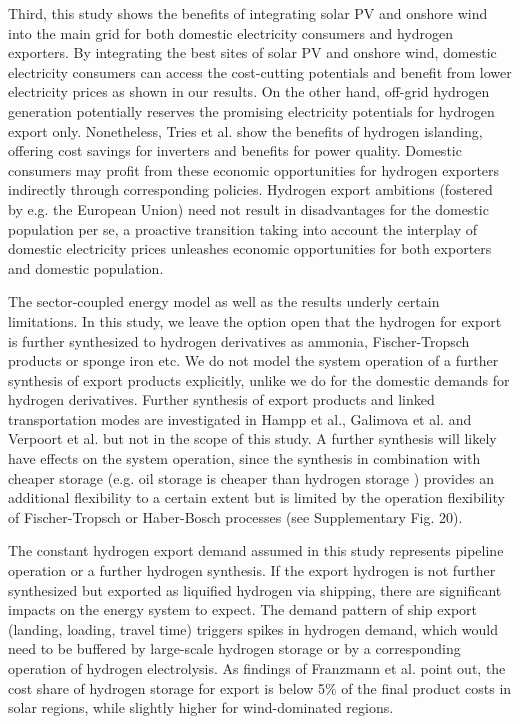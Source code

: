 Third, this study shows the benefits of integrating solar PV and onshore wind into the main grid for both domestic electricity consumers and hydrogen exporters. By integrating the best sites of solar PV and onshore wind, domestic electricity consumers can access the cost-cutting potentials and benefit from lower electricity prices as shown in our results. On the other hand, off-grid hydrogen generation potentially reserves the promising electricity potentials for hydrogen export only. Nonetheless, Tries et al.\cite{Tries2023b} show the benefits of hydrogen islanding, offering cost savings for inverters and benefits for power quality. Domestic consumers may profit from these economic opportunities for hydrogen exporters indirectly through corresponding policies.
Hydrogen export ambitions (fostered by e.g. the European Union) need not result in disadvantages for the domestic population per se, a proactive transition taking into account the interplay of domestic electricity prices unleashes economic opportunities for both exporters and domestic population.



The sector-coupled energy model as well as the results underly certain limitations. In this study, we leave the option open that the hydrogen for export is further synthesized to hydrogen derivatives as ammonia, Fischer-Tropsch products or sponge iron etc. We do not model the system operation of a further synthesis of export products explicitly, unlike we do for the domestic demands for hydrogen derivatives. Further synthesis of export products and linked transportation modes are investigated in Hampp et al.\cite{Hampp2023}, Galimova et al.\cite{Galimova2023} and Verpoort et al.\cite{Verpoort2024} but not in the scope of this study.
A further synthesis will likely have effects on the system operation, since the synthesis in combination with cheaper storage (e.g. oil storage is cheaper than hydrogen storage \cite{DEA2019TechnologyData}) provides an additional flexibility to a certain extent but is limited by the operation flexibility of Fischer-Tropsch or Haber-Bosch processes (see Supplementary Fig. 20). %

The constant hydrogen export demand assumed in this study represents pipeline operation or a further hydrogen synthesis.
If the export hydrogen is not further synthesized but exported as liquified hydrogen via shipping, there are significant impacts on the energy system to expect. The demand pattern of ship export (landing, loading, travel time) triggers spikes in hydrogen demand, which would need to be buffered by large-scale hydrogen storage or by a corresponding operation of hydrogen electrolysis. As findings of Franzmann et al. \cite{Franzmann2023} point out, the cost share of hydrogen storage for export is below 5\% of the final product costs in solar regions, while slightly higher for wind-dominated regions.

